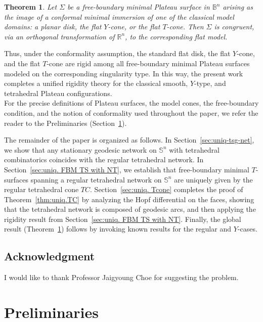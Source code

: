 \documentclass[11pt]{amsart}
\numberwithin{equation}{section}
\theoremstyle{theorem}
\newtheorem{theorem}{Theorem}[section]
\theoremstyle{definition}
\numberwithin{equation}{section}
\begin{document}
\begin{theorem}\label{thm:uniq.PlateauSurfaces}
Let \(\Sigma\) be a free-boundary minimal Plateau surface in \(\mathbb{B}^n\) arising as the image of a conformal minimal immersion of one of the classical model domains: a planar disk, the flat \(Y\)-cone, or the flat \(T\)-cone. Then \(\Sigma\) is congruent, via an orthogonal transformation of \(\mathbb{R}^n\), to the corresponding flat model.
\end{theorem}

Thus, under the conformality assumption, the standard flat disk, the flat \(Y\)-cone, and the flat \(T\)-cone are rigid among all free-boundary minimal Plateau surfaces modeled on the corresponding singularity type. In this way, the present work completes a unified rigidity theory for the classical smooth, \(Y\)-type, and tetrahedral Plateau configurations.\\
For the precise definitions of Plateau surfaces, the model cones, the free-boundary condition, and the notion of conformality used throughout the paper, we refer the reader to the Preliminaries (Section~\ref{Sec1-Preliminaries}).

The remainder of the paper is organized as follows. In Section~\ref{sec:uniq-tsg-net}, we show that any stationary geodesic network on $\mathbb{S}^n$ with tetrahedral combinatorics coincides with the regular tetrahedral network. In Section~\ref{sec:uniq. FBM TS with NT}, we establish that free-boundary minimal $T$-surfaces spanning a regular tetrahedral network on $\mathbb{S}^n$ are uniquely given by the regular tetrahedral cone $TC$. Section~\ref{sec:uniq. Tcone} completes the proof of Theorem~\ref{thm:uniq.TC} by analyzing the Hopf differential on the faces, showing that the tetrahedral network is composed of geodesic arcs, and then applying the rigidity result from Section~\ref{sec:uniq. FBM TS with NT}. Finally, the global result (Theorem~\ref{thm:uniq.PlateauSurfaces}) follows by invoking known results for the regular and $Y$-cases.

\subsection*{Acknowledgment} I would like to thank Professor Jaigyoung Choe for suggesting the problem.




\section{Preliminaries}\label{Sec1-Preliminaries}
\end{document}
